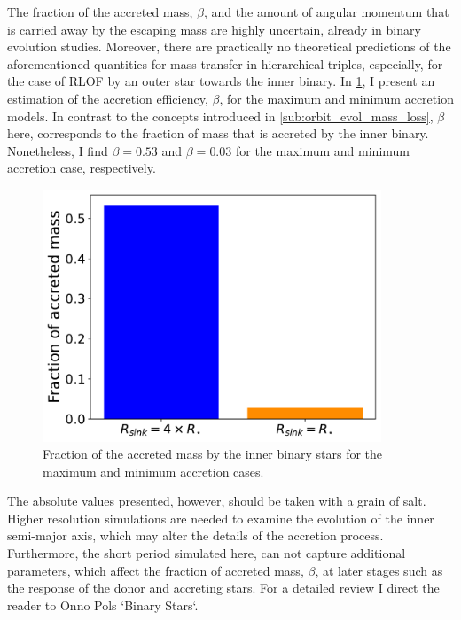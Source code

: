 The fraction of the accreted mass, $\beta$, and the amount of angular momentum that is carried away by the escaping mass are highly uncertain, already in binary evolution studies. Moreover, there are practically no theoretical predictions of the aforementioned quantities for mass transfer in hierarchical triples, especially, for the case of RLOF by an outer star towards the inner binary. In \cref{fig:accretion_eff_binary}, I present an estimation of the accretion efficiency, $\beta$, for the maximum and minimum accretion models. In contrast to the concepts introduced in \cref{sub:orbit_evol_mass_loss}, $\beta$ here, corresponds to the fraction of mass that is accreted by the inner binary. Nonetheless, I find $\beta = 0.53$ and $\beta = 0.03$ for the maximum and minimum accretion case, respectively. 
\begin{figure}[!htb]
    \centering
    \includegraphics[width=0.9\textwidth]{Thesis/graphs/accretion_case/accretion_binary_acc_efficiency.pdf}
    \caption{Fraction of the accreted mass by the inner binary stars for the maximum and minimum accretion cases.}
    \label{fig:accretion_eff_binary}
\end{figure}

The absolute values presented, however, should be taken with a grain of salt. Higher resolution simulations are needed to examine the evolution of the inner semi-major axis, which may alter the details of the accretion process. Furthermore, the short period simulated here, can not capture additional parameters, which affect the fraction of accreted mass, $\beta$, at later stages such as the response of the donor and accreting stars. For a detailed review I direct the reader to Onno Pols `Binary Stars`.

